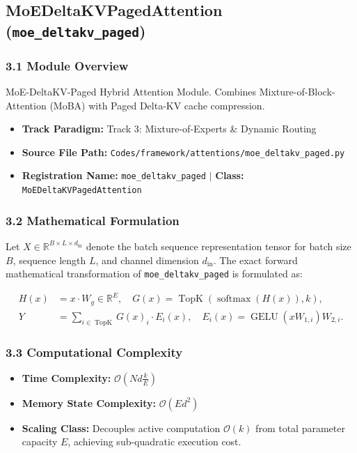 \subsection{MoEDeltaKVPagedAttention (\texttt{moe\_deltakv\_paged})}
\label{sec:app_module_moe\_deltakv\_paged}

\subsubsection*{3.1 Module Overview}
MoE-DeltaKV-Paged Hybrid Attention Module. Combines Mixture-of-Block-Attention (MoBA) with Paged Delta-KV cache compression.
\begin{itemize}
    \item \textbf{Track Paradigm:} Track 3: Mixture-of-Experts & Dynamic Routing
    \item \textbf{Source File Path:} \texttt{Codes/framework/attentions/moe\_deltakv\_paged.py}
    \item \textbf{Registration Name:} \texttt{moe\_deltakv\_paged} $\mid$ \textbf{Class:} \texttt{MoEDeltaKVPagedAttention}
\end{itemize}

\subsubsection*{3.2 Mathematical Formulation}
Let $X \in \mathbb{R}^{B \times L \times d_{\text{in}}}$ denote the batch sequence representation tensor for batch size $B$, sequence length $L$, and channel dimension $d_{\text{in}}$. The exact forward mathematical transformation of \texttt{moe\_deltakv\_paged} is formulated as:

\begin{align}
H(x) &= x \cdot W_g \in \mathbb{R}^{E}, \quad G(x) = \operatorname{TopK}\left(\operatorname{softmax}(H(x)), k\right), \\
Y &= \sum_{i \in \operatorname{TopK}} G(x)_i \cdot E_i(x), \quad E_i(x) = \operatorname{GELU}(x W_{1, i}) W_{2, i}.
\end{align}


\subsubsection*{3.3 Computational Complexity}
\begin{itemize}
    \item \textbf{Time Complexity:} $\mathcal{O}(N d \frac{k}{E})$
    \item \textbf{Memory State Complexity:} $\mathcal{O}(E d^2)$
    \item \textbf{Scaling Class:} Decouples active computation $\mathcal{O}(k)$ from total parameter capacity $E$, achieving sub-quadratic execution cost.
\end{itemize}

